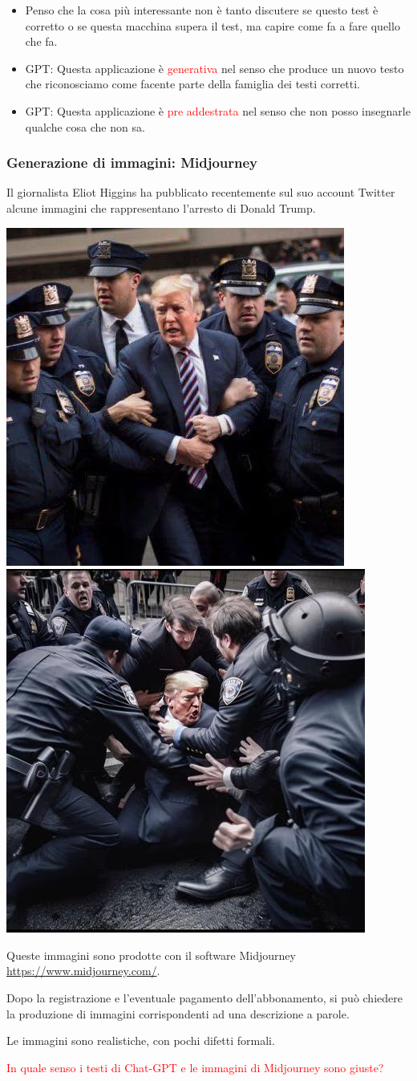 \documentclass[xcolor=svgnames]{beamer}
\newcommand{\rosso}[1]{\textcolor{red}{#1}}
\renewcommand{\emph}{\rosso}
\begin{document}
\begin{frame}
\begin{itemize}
\item Penso che la cosa più interessante non è tanto discutere se questo test è corretto o se questa macchina supera il test, ma capire come fa a fare quello che fa.

\item GPT: Questa applicazione è \emph{generativa} nel senso che produce un nuovo testo che riconosciamo come facente parte della famiglia dei testi corretti.
\item GPT: Questa applicazione è \emph{pre addestrata} nel senso che non posso insegnarle qualche cosa che non sa.

\end{itemize}

\end{frame}

\begin{frame}[plain]\small\frametitle{Generazione di immagini: Midjourney}
Il giornalista Eliot Higgins ha pubblicato recentemente sul suo account Twitter alcune immagini che rappresentano l'arresto di Donald Trump.

  \includegraphics[width=.4\textwidth]{pictures/trump-1.jpg}  \hfill 
   \includegraphics[width=.4\textwidth]{pictures/trump-2.jpg}  


    Queste immagini sono prodotte con il software Midjourney \url{https://www.midjourney.com/}. 
    
    Dopo la registrazione e l'eventuale pagamento dell'abbonamento, si può chiedere la produzione di immagini corrispondenti ad una descrizione a parole.

Le immagini sono realistiche, con pochi difetti formali.  

    \emph{In quale senso i testi di Chat-GPT  e le immagini di Midjourney sono giuste?}

  \end{frame}
\end{document}
